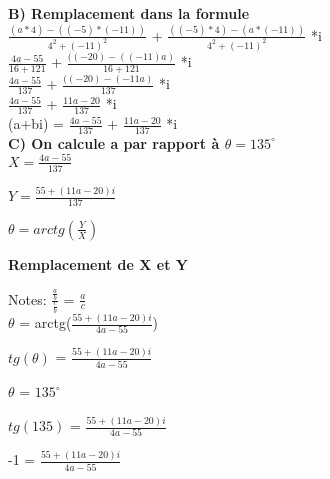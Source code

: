 \vspace{5mm} %

\textbf{B) Remplacement dans la formule} \\

$\frac{(a * 4) - ((-5)*(-11))} {4^{2}+(-11)^{2} } $ + $\frac{( (-5) * 4) - (a*(-11))} {4^{2}+(-11)^{2} } $ *i \\

$\frac{4a -55} {16+121} $ + $\frac{( (-20) - ((-11)a)} {16+121} $ *i \\

$\frac{4a -55} {137} $ + $\frac{( (-20) - (-11a)} {137} $ *i \\

$\frac{4a -55} {137} $ + $\frac{11a-20} {137} $ *i \\

(a+bi) = $\frac{4a -55} {137} $ + $\frac{11a-20} {137} $ *i \\

\vspace{8mm} %
\textbf{C) On calcule a par rapport à $\theta = 135^{\circ}$}  \\

$X = \frac{4a-55}{137}$
\vspace{5mm} %

$Y= \frac{55+(11a-20)i}{137}$
\vspace{5mm} %

$\theta = arctg(\frac{Y}{X})$
\vspace{5mm} %

\textbf{Remplacement de X et Y}
\vspace{5mm} %

Notes: $\frac{\frac{a}{b}}{\frac{c}{b}}$ = $\frac{a}{c}$ \\

$\theta$ = arctg($\frac{55+(11a-20)i}{4a-55}$)
\vspace{5mm} %

$tg(\theta)$ = $\frac{55+(11a-20)i}{4a-55}$
\vspace{5mm} %

$\theta$ = $135^{\circ}$
\vspace{5mm} %

$tg(135)$ = $\frac{55+(11a-20)i}{4a-55}$
\vspace{5mm} %

-1 = $\frac{55+(11a-20)i}{4a-55}$
\vspace{5mm} %

